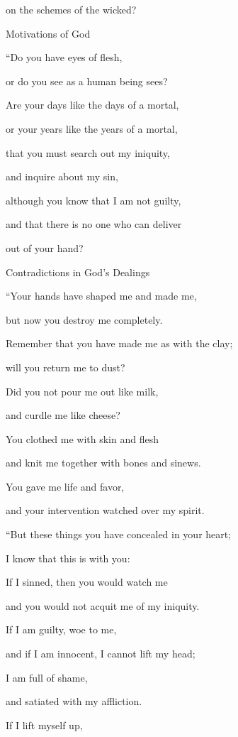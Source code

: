 {\par }{\Q on
the schemes
of the wicked?
\par }{\SH Motivations of God
\par }{\Q {}“Do you have eyes
of flesh,
\par }{\Q or
do you see
as a human
being sees?
\par }{\Q {}Are
your days
like the days
of a mortal,
\par }{\Q or
your years
like the years
of a mortal,
\par }{\Q {}that
you must search
out my iniquity,
\par }{\Q and inquire
about my sin,
\par }{\Q {}although you know
that
I am
not
guilty,
\par }{\Q and that there is no
one who can deliver
\par }{\Q out of your hand?
\par }{\SH Contradictions in God’s Dealings
\par }{\Q {}“Your hands
have shaped
me and made
me,
\par }{\Q but now you destroy
me completely.
\par }{\Q {}Remember
that
you have made
me
as with the clay;
\par }{\Q will you return
me to
dust?
\par }{\Q {}Did you not
pour me out like milk,
\par }{\Q and curdle
me like cheese?
\par }{\Q {}You clothed
me with skin
and flesh
\par }{\Q and knit me together with bones
and sinews.
\par }{\Q {}You gave me
life
and favor,
\par }{\Q and your intervention
watched
over my
spirit.
\par }{\Q {}“But these
things you have concealed
in your heart;
\par }{\Q I know
that
this
is with you:
\par }{\Q {}If
I sinned,
then you would watch
me
\par }{\Q and you would not
acquit
me of my iniquity.
\par }{\Q {}If
I am guilty,
woe
to me,
\par }{\Q and if I am innocent,
I cannot
lift
my head;
\par }{\Q I am full
of shame,
\par }{\Q and satiated
with my affliction.
\par }{\Q {}If
I lift
myself up,

}

